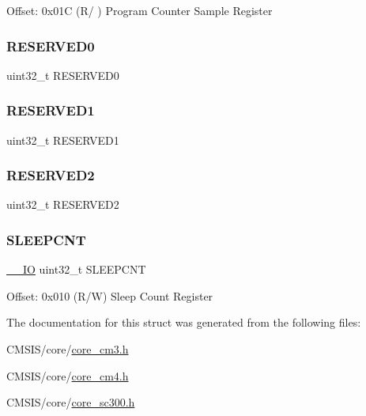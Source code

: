 Offset\+: 0x01C (R/ ) Program Counter Sample Register \mbox{\label{struct_d_w_t___type_a3bc109a372d05329e22cb7e3bf2b84ba}} 
\subsubsection{\texorpdfstring{RESERVED0}{RESERVED0}}
{\footnotesize\ttfamily uint32\+\_\+t R\+E\+S\+E\+R\+V\+E\+D0}

\mbox{\label{struct_d_w_t___type_a9b85a62ba1c4cf0e4ca2b1ff8e5bc85c}} 
\subsubsection{\texorpdfstring{RESERVED1}{RESERVED1}}
{\footnotesize\ttfamily uint32\+\_\+t R\+E\+S\+E\+R\+V\+E\+D1}

\mbox{\label{struct_d_w_t___type_aa4de71b2a578cce3a67229dde3c6b52d}} 
\subsubsection{\texorpdfstring{RESERVED2}{RESERVED2}}
{\footnotesize\ttfamily uint32\+\_\+t R\+E\+S\+E\+R\+V\+E\+D2}

\mbox{\label{struct_d_w_t___type_a720f3795a53a8d8f275df636fee1aee7}} 
\subsubsection{\texorpdfstring{SLEEPCNT}{SLEEPCNT}}
{\footnotesize\ttfamily \mbox{\hyperlink{core__sc300_8h_aec43007d9998a0a0e01faede4133d6be}{\+\_\+\+\_\+\+IO}} uint32\+\_\+t S\+L\+E\+E\+P\+C\+NT}

Offset\+: 0x010 (R/W) Sleep Count Register 

The documentation for this struct was generated from the following files\+:\begin{DoxyCompactItemize}
\item 
C\+M\+S\+I\+S/core/\mbox{\hyperlink{core__cm3_8h}{core\+\_\+cm3.\+h}}\item 
C\+M\+S\+I\+S/core/\mbox{\hyperlink{core__cm4_8h}{core\+\_\+cm4.\+h}}\item 
C\+M\+S\+I\+S/core/\mbox{\hyperlink{core__sc300_8h}{core\+\_\+sc300.\+h}}\end{DoxyCompactItemize}
